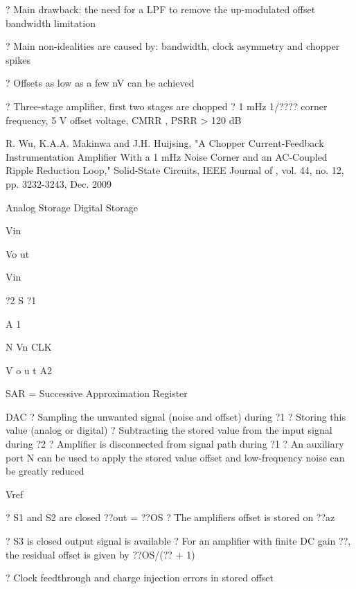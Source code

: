 \documentclass[2pt,landscape]{article}
\begin{document}
\begin{multicols*}{5}
?	Main drawback: the need for a LPF to remove the up-modulated offset 
bandwidth limitation

?	Main non-idealities are caused by:
bandwidth, clock asymmetry and chopper spikes


?	Offsets as low as a few nV can be achieved



?	Three-stage amplifier, first two stages are chopped
?	1 mHz 1/???? corner frequency, 5 \textbullet V offset voltage, 
CMRR , PSRR > 120 dB



R. Wu, K.A.A. Makinwa and J.H. Huijsing, "A Chopper Current-Feedback Instrumentation Amplifier With a 1 mHz 
Noise Corner and an AC-Coupled Ripple Reduction Loop," Solid-State Circuits, IEEE Journal of , vol. 44, no. 12, 
pp. 3232-3243, Dec. 2009


Analog Storage	Digital Storage



Vin



Vo
ut



Vin


?2 
S
?1


A
1

N
Vn	CLK



V
o
u
t
A2



SAR = Successive
Approximation 
Register



DAC
?	Sampling the unwanted signal (noise and offset) during ?1
?	Storing this value (analog or digital)
?	Subtracting the stored value from the input signal during ?2
?	Amplifier is disconnected from signal path during ?1
?	An auxiliary port N can be used to apply the stored value 
offset and low-frequency noise can be greatly reduced


Vref



?	S1 and S2 are closed
??out = ??OS
?	The amplifier\textbullet s offset 
is stored on ??az

?	S3 is closed
output signal 
is available
?	For an amplifier with finite 
DC gain ??, the residual 
offset is given by ??OS/(?? + 1)



?	Clock feedthrough and charge injection 
errors in stored offset






\end{multicols*}
\end{document}
